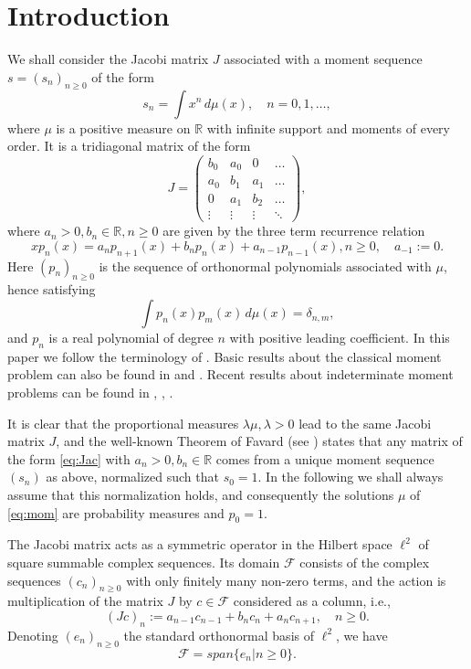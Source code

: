 \documentclass [12pt]{article}
\renewcommand{\span}{span}
\newcommand{\R}{\mathbb{R}}
\newcommand{\la}{\lambda}
\begin{document}
\section{Introduction} We shall consider the Jacobi matrix $J$ associated with a moment sequence $s=(s_n)_{n\ge 0}$ of the form
\begin{equation}\label{eq:mom}
s_n=\int x^n\,d\mu(x),\quad n=0,1,\ldots,
\end{equation}
where $\mu$ is a positive measure on $\R$  with infinite support and moments of every order. It is a tridiagonal matrix of the  form
\begin{equation}\label{eq:Jac}
J=\begin{pmatrix}
b_0 & a_0 & 0 & \hdots\\
a_0 & b_1 & a_1 & \hdots\\
0 & a_1 & b_2 & \hdots\\
\vdots &\vdots & \vdots & \ddots
\end{pmatrix},
\end{equation}
where $a_n>0, b_n\in\R, n\ge 0$  are given by the three term recurrence relation
\begin{equation*}\label{eq:3term}
xp_n(x)=a_np_{n+1}(x)+b_np_n(x)+a_{n-1}p_{n-1}(x), n\ge 0, \quad a_{-1}:=0.
\end{equation*}
Here $(p_n)_{n\ge 0}$ is the sequence of orthonormal polynomials associated with $\mu$, hence satisfying
\begin{equation*}\label{eq:op}
\int p_n(x)p_m(x)\,d\mu(x)=\delta_{n,m},
\end{equation*}
and $p_n$ is a real polynomial of degree $n$ with positive leading coefficient. In this paper   we follow the terminology of \cite{Sch}. Basic results about the classical moment problem can also be found in \cite{Ak} and \cite{S}. Recent  results about indeterminate moment problems can be found in \cite{B:S1}, \cite{B:S2} \cite{B:S3}, \cite{B:S4}.

 It is  clear that the proportional measures $\la\mu, \la>0$ lead to the same Jacobi matrix $J$, and the well-known Theorem of Favard (see \cite[Theorem 5.14]{Sch}) states that any matrix of the form \eqref{eq:Jac} with $a_n>0, b_n\in\R$ comes from a unique  moment sequence  $(s_n)$ as above, normalized such that $s_0=1$. In the following we shall always assume that this normalization holds, and consequently the solutions $\mu$ of \eqref{eq:mom} are probability measures  and $p_0=1$.

The Jacobi matrix acts as a symmetric operator  in the Hilbert space $\ell^2$ of square summable complex sequences. Its domain $\mathcal F$ consists of the complex sequences $(c_n)_{n\ge 0}$ with only finitely many non-zero terms, and the action is multiplication of the matrix $J$ by $c\in\mathcal F$ considered as a column, i.e.,
\begin{equation}\label{eq:J} 
(Jc)_n:=a_{n-1}c_{n-1}+b_n c_n+a_n c_{n+1},\quad n\ge 0.
\end{equation}
Denoting $(e_n)_{n\ge 0}$ the standard orthonormal basis of $\ell^2$, we have
\begin{equation*}\label{eq:F}
\mathcal F=\span\{e_n|n\ge 0\}.
\end{equation*}
\end{document}
